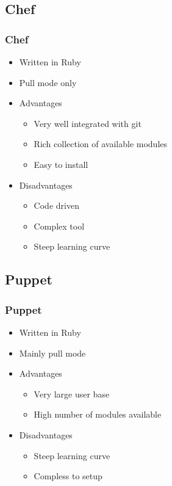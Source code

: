\documentclass[t,aspectratio=169]{beamer}
\begin{document}
\subsection{Chef}
\begin{frame}
    \frametitle{Chef}
    \begin{itemize}
        \item<2-> Written in Ruby 
        \item<3-> Pull mode only
        \item<4-> Advantages
        \begin{itemize}
            \item<5-> Very well integrated with git
            \item<6-> Rich collection of available modules
            \item<7-> Easy to install
        \end{itemize}
        \item<8-> Disadvantages
        \begin{itemize}
            \item<9-> Code driven
            \item<10-> Complex tool
            \item<11-> Steep learning curve
        \end{itemize}
    \end{itemize}
\end{frame}

\subsection{Puppet}
\begin{frame}
    \frametitle{Puppet}
    \begin{itemize}
        \item<2-> Written in Ruby
        \item<3-> Mainly pull mode
        \item<4-> Advantages
        \begin{itemize}
            \item<5-> Very large user base
            \item<6-> High number of modules available
        \end{itemize}
        \item<7-> Disadvantages
        \begin{itemize}
            \item<8-> Steep learning curve
            \item<9-> Compless to setup
        \end{itemize}
    \end{itemize}
\end{frame}
\end{document}
